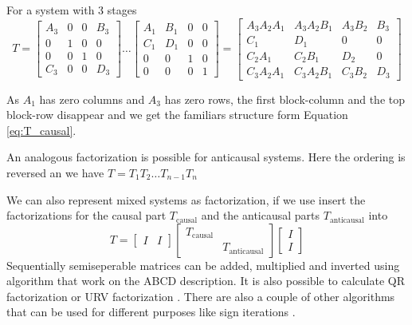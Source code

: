\documentclass[doctype=mastersthesis,BCOR=15mm,biblatex]{ldvbook}%
\newcommand{\eye}{I} %
\begin{document}
For a system with 3 stages
\begin{equation*}
	T=
	\left[\begin{matrix}A_{3} & 0 & 0 & B_{3}\\0 & 1 & 0 & 0\\0 & 0 & 1 & 0\\C_{3} & 0 & 0 & D_{3}\end{matrix}\right]
\dots
	\left[\begin{matrix}A_{1} & B_{1} & 0 & 0\\C_{1} & D_{1} & 0 & 0\\0 & 0 & 1 & 0\\0 & 0 & 0 & 1\end{matrix}\right]
	=
	\left[\begin{matrix}A_{3} A_{2} A_{1} & A_{3} A_{2} B_{1} & A_{3} B_{2} & B_{3}\\C_{1} & D_{1} & 0 & 0\\C_{2} A_{1} & C_{2} B_{1} & D_{2} & 0\\C_{3} A_{2} A_{1} & C_{3} A_{2} B_{1} & C_{3} B_{2} & D_{3}\end{matrix}\right]
\end{equation*}

As $A_1$ has zero columns and $A_3$ has zero rows, the first block-column and the top block-row disappear and we get the familiars structure form Equation\,\ref{eq:T_causal}.

An analogous factorization is possible for anticausal systems.
Here the ordering is reversed an we have $T = T_1 T_2 \dots T_{n-1} T_{n}$

We can also represent mixed systems as factorization, if we use insert the factorizations for the causal part $T_{\text{causal}}$ and the anticausal parts $T_{\text{anticausal}}$ into
\begin{equation}
	T = 
	\begin{bmatrix}
	\eye &
	\eye
	\end{bmatrix}
	\begin{bmatrix}
	T_{\text{causal}}&\\
	&T_{\text{anticausal}}
	\end{bmatrix}	
	\begin{bmatrix}
	\eye\\
	\eye
	\end{bmatrix}
\end{equation}
Sequentially semiseperable matrices can be added, multiplied and inverted using algorithm that work on the ABCD description.
It is also possible to calculate QR factorization \cite{chandrasekaran_fast_2002,tong_blind_2003} or URV factorization \cite{chandrasekaran_fast_2005}. 
There are also a couple of other algorithms that can be used for different purposes like sign iterations \cite{rice_efficient_2010}.
\end{document}
